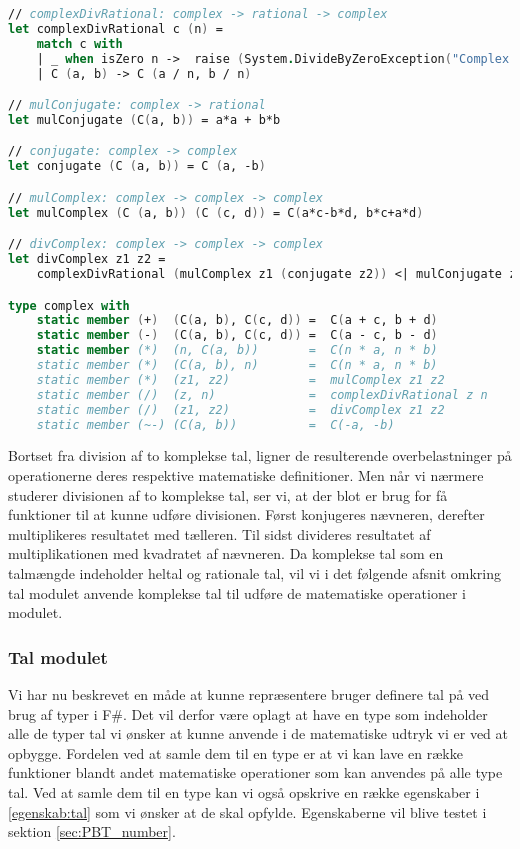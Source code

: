 \documentclass{article}
\begin{document}
\begin{lstlisting}[language={FSharp}, 
    label={complex_operations},
    caption={Overskrivning af operationer på komplekse tal}]
// complexDivRational: complex -> rational -> complex
let complexDivRational c (n) = 
    match c with
    | _ when isZero n ->  raise (System.DivideByZeroException("Complex.divRational: Cannot divide by zero!"))
    | C (a, b) -> C (a / n, b / n) 

// mulConjugate: complex -> rational
let mulConjugate (C(a, b)) = a*a + b*b

// conjugate: complex -> complex
let conjugate (C (a, b)) = C (a, -b)

// mulComplex: complex -> complex -> complex
let mulComplex (C (a, b)) (C (c, d)) = C(a*c-b*d, b*c+a*d)

// divComplex: complex -> complex -> complex
let divComplex z1 z2 =
    complexDivRational (mulComplex z1 (conjugate z2)) <| mulConjugate z2

type complex with
    static member (+)  (C(a, b), C(c, d)) =  C(a + c, b + d)
    static member (-)  (C(a, b), C(c, d)) =  C(a - c, b - d)
    static member (*)  (n, C(a, b))       =  C(n * a, n * b)
    static member (*)  (C(a, b), n)       =  C(n * a, n * b)
    static member (*)  (z1, z2)           =  mulComplex z1 z2
    static member (/)  (z, n)             =  complexDivRational z n
    static member (/)  (z1, z2)           =  divComplex z1 z2 
    static member (~-) (C(a, b))          =  C(-a, -b)
\end{lstlisting}    

Bortset fra division af to komplekse tal, ligner de resulterende overbelastninger på operationerne deres respektive matematiske definitioner. Men når vi nærmere studerer divisionen af to komplekse tal, ser vi, at der blot er brug for få funktioner til at kunne udføre divisionen. Først konjugeres nævneren, derefter multiplikeres resultatet med tælleren. Til sidst divideres resultatet af multiplikationen med kvadratet af nævneren. Da komplekse tal som en talmængde indeholder heltal og rationale tal, vil vi i det følgende afsnit omkring tal modulet anvende komplekse tal til udføre de matematiske operationer i modulet.


\subsubsection{Tal modulet}
Vi har nu beskrevet en måde at kunne repræsentere bruger definere tal på ved brug af typer i F\#. Det vil derfor være oplagt at have en type som indeholder alle de typer tal vi ønsker at kunne anvende i de matematiske udtryk vi er ved at opbygge. Fordelen ved at samle dem til en type er at vi kan lave en række funktioner blandt andet matematiske operationer som kan anvendes på alle type tal. Ved at samle dem til en type kan vi også opskrive en række egenskaber i \ref{egenskab:tal} som vi ønsker at de skal opfylde. Egenskaberne vil blive testet i sektion \ref{sec:PBT_number}.
\end{document}
